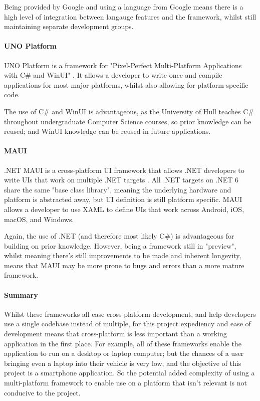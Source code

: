 \documentclass[11pt, a4paper, notitlepage]{report}
\begin{document}
Being provided by Google and using a language from Google means there is a high level of integration between langauge features and the framework, whilst still maintaining separate development groups.

\paragraph{UNO Platform}
UNO Platform is a framework for "Pixel-Perfect Multi-Platform Applications with C\# and WinUI" \citep{UnoWebsite}. It allows a developer to write once and compile applications for most major platforms, whilst also allowing for platform-specific code. 

The use of C\# and WinUI is advantageous, as the University of Hull teaches C\# throughout undergraduate Computer Science courses, so prior knowledge can be reused; and WinUI knowledge can be reused in future applications.

\paragraph{MAUI}
.NET MAUI is a cross-platform UI framework that allows .NET developers to write UIs that work on multiple .NET targets \citep{MAUIWebsite}. All .NET targets on .NET 6 share the same "base class library", meaning the underlying hardware and platform is abstracted away, but UI definition is still platform specific. MAUI allows a developer to use XAML to define UIs that work across Android, iOS, macOS, and Windows.

Again, the use of .NET (and therefore most likely C\#) is advantageous for building on prior knowledge. However, being a framework still in "preview", whilst meaning there's still improvements to be made and inherent longevity, means that MAUI may be more prone to bugs and errors than a more mature framework.

\paragraph{Summary}
Whilst these frameworks all ease cross-platform development, and help developers use a single codebase instead of multiple, for this project expediency and ease of development means that cross-platform is less important than a working application in the first place. For example, all of these frameworks enable the application to run on a desktop or laptop computer; but the chances of a user bringing even a laptop into their vehicle is very low, and the objective of this project is a smartphone application. So the potential added complexity of using a multi-platform framework to enable use on a platform that isn't relevant is not conducive to the project.
\end{document}

